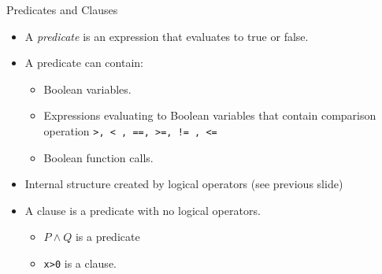 \documentclass{beamer}
\begin{document}
\begin{frame}[fragile]{Predicates and Clauses}
  \begin{itemize}
  \item A {\em predicate} is an expression that evaluates to true or
    false.
   \item A predicate can contain:
     \begin{itemize}
     \item Boolean variables.
     \item Expressions evaluating to  Boolean variables that contain
       comparison operation {\tt >, < , ==, >=, != , <=}
     \item  Boolean function calls.
     \end{itemize}
   \item Internal structure created by logical operators (see
     previous slide)
   \item A clause is a predicate with no logical operators.
     \begin{itemize}
     \item $P \land Q$ is a predicate
     \item \verb+x>0+ is a clause. 
     \end{itemize}
  \end{itemize}
\end{frame}
\end{document}
